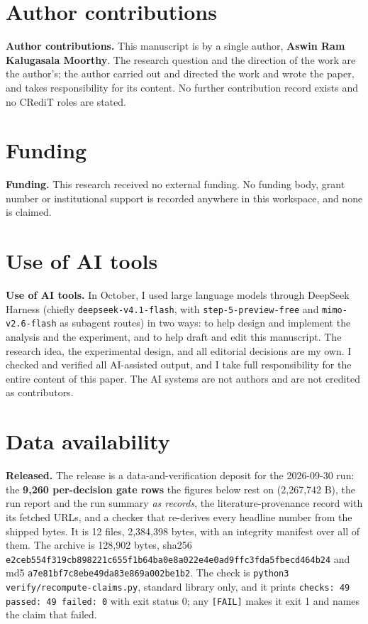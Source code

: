 \documentclass[11pt,a4paper]{article}
\begin{document}
\section*{Author contributions}

\textbf{Author contributions.} This manuscript is by a single author, \textbf{Aswin Ram Kalugasala Moorthy}. The research question and the direction of the work are the author's; the author carried out and directed the work and wrote the paper, and takes responsibility for its content. No further contribution record exists and no CRediT roles are stated.

\section*{Funding}

\textbf{Funding.} This research received no external funding. No funding body, grant number or institutional support is recorded anywhere in this workspace, and none is claimed.

\section*{Use of AI tools}

\textbf{Use of AI tools.} In October, I used large language models through DeepSeek Harness (chiefly \texttt{deepseek-v4.1-flash}, with \texttt{step-5-preview-free} and \texttt{mimo-v2.6-flash} as subagent routes) in two ways: to help design and implement the analysis and the experiment, and to help draft and edit this manuscript. The research idea, the experimental design, and all editorial decisions are my own. I checked and verified all AI-assisted output, and I take full responsibility for the entire content of this paper. The AI systems are not authors and are not credited as contributors.

\section*{Data availability}

\textbf{Released.} The release is a data-and-verification deposit for the 2026-09-30 run: the \textbf{9,260 per-decision gate rows} the figures below rest on (2,267,742 B), the run report and the run summary \emph{as records}, the literature-provenance record with its fetched URLs, and a checker that re-derives every headline number from the shipped bytes. It is 12 files, 2,384,398 bytes, with an integrity manifest over all of them. The archive is 128,902 bytes, sha256 \texttt{e2ceb554f319cb898221c655f1b64ba0e8a022e4e0ad9ffc3fda5fbecd464b24} and md5 \texttt{a7e81bf7c8ebe49da83e869a002be1b2}. The check is \texttt{python3 verify/recompute-claims.py}, standard library only, and it prints \texttt{checks: 49 passed: 49 failed: 0} with exit status 0; any \texttt{[FAIL]} makes it exit 1 and names the claim that failed.
\end{document}

